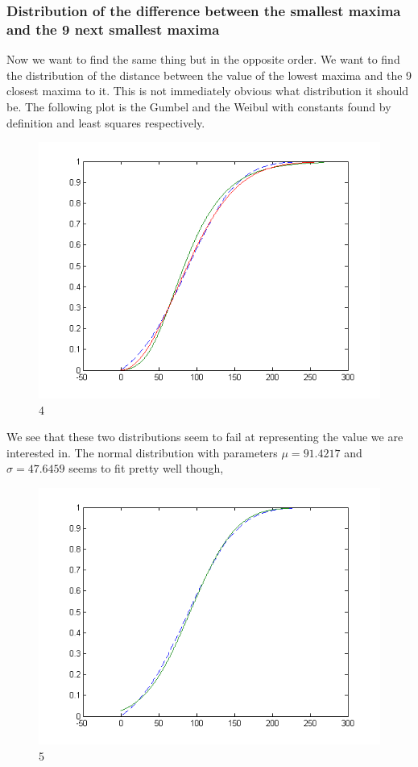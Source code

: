 \documentclass[12pt]{article}
\begin{document}
\subsubsection{Distribution of the difference between the smallest maxima and the 9 next smallest maxima}

Now we want to find the same thing but in the opposite order. We want to find the distribution of the distance between the value of the lowest maxima and the 9 closest maxima to it. This is not immediately obvious what distribution it should be. The following plot is the Gumbel and the Weibul with constants found by definition and least squares respectively.

\begin{figure}[hpt]
	\centering
		\includegraphics[width=1.00\textwidth]{pnC_512_bot10diff_gumbel_weibull.png}
	\caption{4}
	\label{fig:pnC_512_bot10diff_gumbel_weibull}
\end{figure}

We see that these two distributions seem to fail at representing the value we are interested in. The normal distribution with parameters $\mu = 91.4217$ and $\sigma = 47.6459$ seems to fit pretty well though,

\begin{figure}[hpt]
	\centering
		\includegraphics[width=1.00\textwidth]{pnC_512_bot10diff_normal.png}
	\caption{5}
	\label{fig:pnC_512_bot10diff_normal}
\end{figure}
\end{document}
